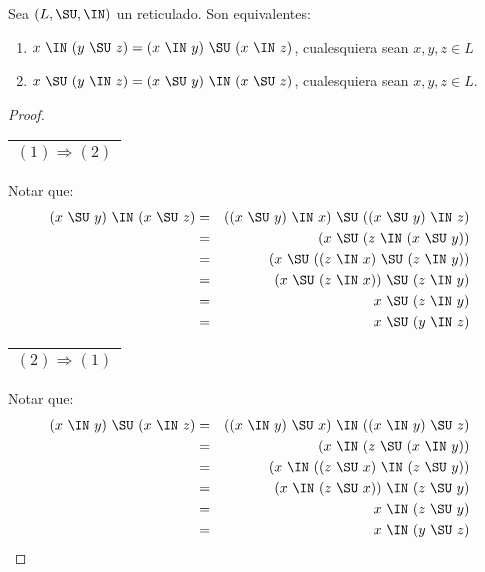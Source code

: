   \begin{lemma}
    \PN Sea $(L, \SU, \IN)$ un reticulado. Son equivalentes:
    \begin{enumerate}[(1)]
      \item $x \ \IN \ (y \ \SU \ z) = (x \ \IN \ y) \ \SU \ (x \ \IN \ z)$, cualesquiera sean $x, y, z \in L$
      \item $x \ \SU \ (y \ \IN \ z) = (x \ \SU \ y) \ \IN \ (x \ \SU \ z)$, cualesquiera sean $x, y, z \in L$.
    \end{enumerate}
  \end{lemma}
  \begin{proof}
    \PN \begin{tabular}{|c|} \hline $(1) \Rightarrow (2)$ \\\hline \end{tabular} Notar que:
    \begin{eqnarray*}
      (x \ \SU \ y) \ \IN \ (x \ \SU \ z) &=& ((x \ \SU \ y) \ \IN \ x) \ \SU \ ((x \ \SU \ y) \ \IN \ z) \\
      &=& (x \ \SU \ (z \ \IN \ (x \ \SU \ y)) \\
      &=& (x \ \SU \ ((z \ \IN \ x) \ \SU \ (z \ \IN \ y)) \\
      &=& (x \ \SU \ (z \ \IN \ x)) \ \SU \ (z \ \IN \ y) \\
      &=& x \ \SU \ (z \ \IN \ y) \\
      &=& x \ \SU \ (y \ \IN \ z)
    \end{eqnarray*}

    \PN \begin{tabular}{|c|} \hline $(2) \Rightarrow (1)$ \\\hline \end{tabular} Notar que:
    \begin{eqnarray*}
      (x \ \IN \ y) \ \SU \ (x \ \IN \ z) &=& ((x \ \IN \ y) \ \SU \ x) \ \IN \ ((x \ \IN \ y) \ \SU \ z) \\
      &=& (x \ \IN \ (z \ \SU \ (x \ \IN \ y)) \\
      &=& (x \ \IN \ ((z \ \SU \ x) \ \IN \ (z \ \SU \ y)) \\
      &=& (x \ \IN \ (z \ \SU \ x)) \ \IN \ (z \ \SU \ y) \\
      &=& x \ \IN \ (z \ \SU \ y) \\
      &=& x \ \IN \ (y \ \SU \ z)
    \end{eqnarray*}
  \end{proof}
